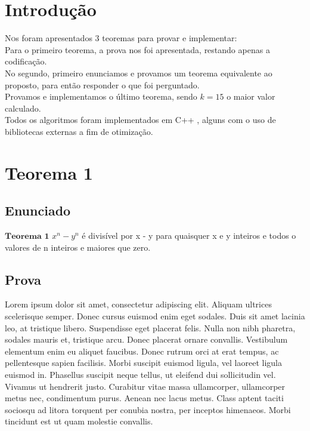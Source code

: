 \documentclass[twoside]{article}
\begin{document}
\begin{multicols}{2} %

\section{Introdução}

\lettrine[nindent=0em,lines=3]{N}os foram apresentados 3 teoremas para provar e implementar:
\\\indent Para o primeiro teorema, a prova nos foi apresentada, restando apenas a codificação.
\\\indent No segundo, primeiro enunciamos e provamos um teorema equivalente ao proposto, para então responder o que foi perguntado.
\\\indent Provamos e implementamos o último teorema, sendo $k = 15$ o maior valor calculado.
\\\indent Todos os algoritmos foram implementados em C++ , alguns com o uso de bibliotecas externas a fim de otimização.

\section{Teorema 1}

\subsection{ Enunciado }
\indent  $\mathbf{Teorema}$ $\mathbf{1}$ $x^n - y^n$ é divisível por x - y para quaisquer x e y inteiros e todos o valores de n inteiros e maiores que zero.


\subsection{ Prova }
\indent Lorem ipsum dolor sit amet, consectetur adipiscing elit. Aliquam ultrices scelerisque semper. Donec cursus euismod enim eget sodales. Duis sit amet lacinia leo, at tristique libero. Suspendisse eget placerat felis. Nulla non nibh pharetra, sodales mauris et, tristique arcu. Donec placerat ornare convallis. Vestibulum elementum enim eu aliquet faucibus. Donec rutrum orci at erat tempus, ac pellentesque sapien facilisis. Morbi suscipit euismod ligula, vel laoreet ligula euismod in. Phasellus suscipit neque tellus, ut eleifend dui sollicitudin vel. Vivamus ut hendrerit justo. Curabitur vitae massa ullamcorper, ullamcorper metus nec, condimentum purus. Aenean nec lacus metus. Class aptent taciti sociosqu ad litora torquent per conubia nostra, per inceptos himenaeos. Morbi tincidunt est ut quam molestie convallis.


\end{multicols}
\end{document}
